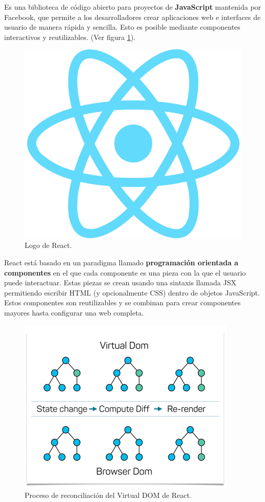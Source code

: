 \documentclass[12pt,twoside,titlepage]{report}
\begin{document}
Es una biblioteca de código abierto para proyectos de \textbf{JavaScript} mantenida por Facebook, que permite a los desarrolladores crear aplicaciones web e interfaces de usuario de manera rápida y sencilla. Esto es posible mediante componentes interactivos y reutilizables.
(Ver figura \ref{fig:ReactLogo}).

\begin{figure}[H]
    \centering
    \includegraphics[scale=0.07]{React/React}
    \caption{Logo de React.}
    \label{fig:ReactLogo}
\end{figure}

React está basado en un paradigma llamado \textbf{programación orientada a componentes} en el que cada componente es una pieza con la que el usuario puede interactuar. Estas piezas se crean usando una sintaxis llamada JSX permitiendo escribir HTML (y opcionalmente CSS) dentro de objetos JavaScript. Estos componentes son reutilizables y se combinan para crear componentes mayores hasta configurar una web completa.

\begin{figure}[H]
    \centering
    \includegraphics[scale=0.5]{React/VirtualDOM1}
    \caption{Proceso de reconciliación del Virtual DOM de React.}
    \label{fig:React_VirtualDom}
\end{figure}
\end{document}
